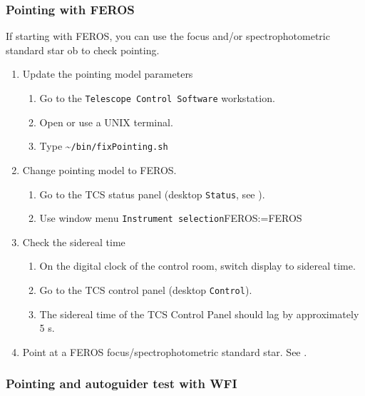 \documentclass[11pt,fleqn,a4paper]{book}
\makeatletter
\def\menu#1#2{\texttt{#1}\ifx{}#2\else\@for\@x:=#2\do{$\rightarrow$\texttt{\@x}}\fi}
\def\wmenu#1#2{window menu \menu{#1}{#2}}
\makeatother
\begin{document}
\subsubsection{Pointing with FEROS}

If starting with FEROS, you can use the \gls{focus} and/or \gls{spectrophotometric standard} star \gls{ob} to check \gls{pointing}.

\begin{enumerate}
  \item Update the \gls{pointing model} parameters
  \begin{enumerate}
     \item Go to the \texttt{Telescope Control Software} workstation.
     \item Open or use a UNIX terminal.
     \item Type  \~{}\texttt{/bin/fixPointing.sh}
  \end{enumerate}
  \item Change \gls{pointing model} to FEROS.
  \begin{enumerate}
    \item Go to the \gls{TCS status panel} (\gls{desktop} \texttt{Status}, see ).
    \item Use \wmenu{Instrument selection}{FEROS}
  \end{enumerate}
  \item Check the sidereal time
  \begin{enumerate}
    \item On the digital clock of the \gls{control room}, switch display to sidereal time.
    \item Go to the \gls{TCS control panel} (\gls{desktop} \texttt{Control}).
    \item The sidereal time of the TCS Control Panel should lag by approximately 5 s. 
  \end{enumerate}
  \item Point at a FEROS \gls{focus}/\gls{spectrophotometric standard} star. See .
\end{enumerate}

\subsubsection{Pointing and autoguider test with WFI}
\end{document}
